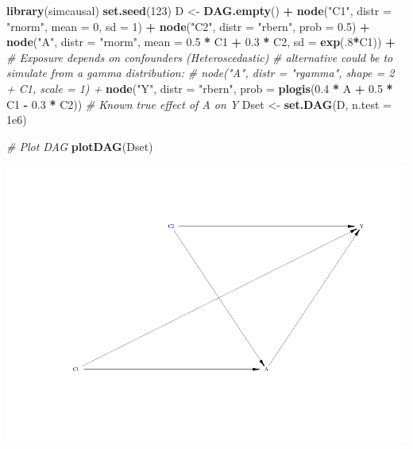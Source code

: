 \documentclass[
]{article}
\newenvironment{Shaded}{\begin{snugshade}}{\end{snugshade}}
\newcommand{\AttributeTok}[1]{\textcolor[rgb]{0.13,0.29,0.53}{#1}}
\newcommand{\CommentTok}[1]{\textcolor[rgb]{0.56,0.35,0.01}{\textit{#1}}}
\newcommand{\DecValTok}[1]{\textcolor[rgb]{0.00,0.00,0.81}{#1}}
\newcommand{\FloatTok}[1]{\textcolor[rgb]{0.00,0.00,0.81}{#1}}
\newcommand{\FunctionTok}[1]{\textcolor[rgb]{0.13,0.29,0.53}{\textbf{#1}}}
\newcommand{\NormalTok}[1]{#1}
\newcommand{\OtherTok}[1]{\textcolor[rgb]{0.56,0.35,0.01}{#1}}
\newcommand{\SpecialCharTok}[1]{\textcolor[rgb]{0.81,0.36,0.00}{\textbf{#1}}}
\newcommand{\StringTok}[1]{\textcolor[rgb]{0.31,0.60,0.02}{#1}}
\begin{document}
\begin{Shaded}
\begin{Highlighting}[]
\FunctionTok{library}\NormalTok{(simcausal)}
\FunctionTok{set.seed}\NormalTok{(}\DecValTok{123}\NormalTok{)}
\NormalTok{D }\OtherTok{\textless{}{-}} \FunctionTok{DAG.empty}\NormalTok{() }\SpecialCharTok{+}
  \FunctionTok{node}\NormalTok{(}\StringTok{"C1"}\NormalTok{, }\AttributeTok{distr =} \StringTok{"rnorm"}\NormalTok{, }\AttributeTok{mean =} \DecValTok{0}\NormalTok{, }\AttributeTok{sd =} \DecValTok{1}\NormalTok{) }\SpecialCharTok{+}
  \FunctionTok{node}\NormalTok{(}\StringTok{"C2"}\NormalTok{, }\AttributeTok{distr =} \StringTok{"rbern"}\NormalTok{, }\AttributeTok{prob =} \FloatTok{0.5}\NormalTok{) }\SpecialCharTok{+}
  \FunctionTok{node}\NormalTok{(}\StringTok{"A"}\NormalTok{, }\AttributeTok{distr =} \StringTok{"rnorm"}\NormalTok{, }\AttributeTok{mean =} \FloatTok{0.5} \SpecialCharTok{*}\NormalTok{ C1 }\SpecialCharTok{+} \FloatTok{0.3} \SpecialCharTok{*}\NormalTok{ C2, }\AttributeTok{sd =} \FunctionTok{exp}\NormalTok{(.}\DecValTok{8}\SpecialCharTok{*}\NormalTok{C1)) }\SpecialCharTok{+}  
  \CommentTok{\# Exposure depends on confounders (Heteroscedastic)}
  \CommentTok{\# alternative could be to simulate from a gamma distribution:}
  \CommentTok{\# node("A", distr = "rgamma", shape = 2 + C1, scale = 1) +}
  \FunctionTok{node}\NormalTok{(}\StringTok{"Y"}\NormalTok{, }\AttributeTok{distr =} \StringTok{"rbern"}\NormalTok{, }\AttributeTok{prob =} \FunctionTok{plogis}\NormalTok{(}\FloatTok{0.4} \SpecialCharTok{*}\NormalTok{ A }\SpecialCharTok{+} \FloatTok{0.5} \SpecialCharTok{*}\NormalTok{ C1 }\SpecialCharTok{{-}} \FloatTok{0.3} \SpecialCharTok{*}\NormalTok{ C2))  }
  \CommentTok{\# Known true effect of A on Y}
\NormalTok{Dset }\OtherTok{\textless{}{-}} \FunctionTok{set.DAG}\NormalTok{(D, }\AttributeTok{n.test =} \FloatTok{1e6}\NormalTok{)}

\CommentTok{\# Plot DAG}
\FunctionTok{plotDAG}\NormalTok{(Dset)}
\end{Highlighting}
\end{Shaded}

\includegraphics{simulation_files/figure-latex/simulate-data-1.pdf}
\end{document}
